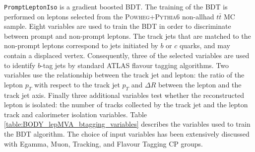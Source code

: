 \texttt{PromptLeptonIso} is a gradient boosted BDT. The training of the BDT is performed on leptons selected from the \textsc{Powheg+Pythia6} non-allhad $t\bar{t}$ MC sample. Eight variables are used to train the BDT in order to discriminate between prompt and non-prompt leptons. The track jets that are matched to the non-prompt leptons correspond to jets initiated by $b$ or $c$ quarks, and may contain a displaced vertex. Consequently, three of the selected variables are used to identify $b$-tag jets by standard ATLAS flavour tagging algorithms. Two variables use the relationship between the track jet and lepton: the ratio of the lepton $p_{T}$ with respect to the track jet $p_{T}$ and $\Delta R$ between the lepton and the track jet axis.  Finally three additional variables test whether the reconstructed lepton is isolated: the number of tracks collected by the track jet and the lepton track and calorimeter isolation variables. Table \ref{table:BODY_lepMVA_btagging_variables} describes the variables used to train the BDT algorithm. The choice of input variables has been extensively discussed with Egamma, Muon, Tracking, and Flavour Tagging CP groups.

